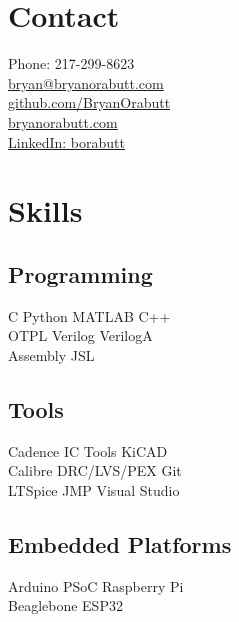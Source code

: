 \documentclass[]{deedy-resume-openfont}
\begin{document}
%
%

%
%

%
%

\begin{minipage}[t]{0.31\textwidth} 

\section{Contact}
Phone: 217-299-8623\\
\href{mailto:bryan@bryanorabutt.com}{bryan@bryanorabutt.com}\\
\href{http://www.github.com/BryanOrabutt}{github.com/BryanOrabutt}\\
\href{http://www.bryanorabutt.com}{bryanorabutt.com}\\
\href{http://www.linkedin.com/in/borabutt}{LinkedIn: borabutt}
\sectionsep

\section{Skills}
\subsection{Programming}
C \textbullet{}   Python \textbullet{} MATLAB \textbullet{} C++ \\ 
OTPL \textbullet{} Verilog \textbullet{} VerilogA \\
Assembly \textbullet{} JSL
\sectionsep

\subsection{Tools}
Cadence IC Tools \textbullet{} KiCAD \\
Calibre DRC/LVS/PEX \textbullet{} Git\\
LTSpice \textbullet{} JMP \textbullet{} Visual Studio
\sectionsep

\subsection{Embedded Platforms}
Arduino \textbullet{} PSoC \textbullet{} Raspberry Pi\\
Beaglebone \textbullet{} ESP32
\sectionsep


\end{minipage}
\end{document}
